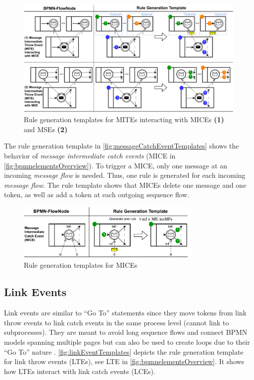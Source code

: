 \documentclass{lmcs} %
\begin{document}
\begin{figure}[ht]
    \centering
    \includegraphics[width=1\textwidth]{images/mite_template.pdf}
    \caption{Rule generation templates for MITEs interacting with MICEs \textbf{(1)} and MSEs \textbf{(2)}}
    \label{fig:messageThrowEventTemplates}
\end{figure}

The rule generation template in \autoref{fig:messageCatchEventTemplates} shows the behavior of \textit{message intermediate catch events} (\textsf{MICE} in \autoref{fig:bpmnelementsOverview}).
To trigger a MICE, only one message at an incoming \textit{message flow} is needed.
Thus, one rule is generated for each incoming \textit{message flow}.
The rule template shows that MICEs delete one message and one token, as well as add a token at each outgoing sequence flow.

\begin{figure}[ht]
    \centering
    \includegraphics[width=0.8\textwidth]{images/mice_template.pdf}
    \caption{Rule generation templates for MICEs}
    \label{fig:messageCatchEventTemplates}
\end{figure}


\subsection{Link Events} \label{subsec:signalEvents}
Link events are similar to \enquote{Go To} statements since they move tokens from link throw events to link catch events in the same process level (cannot link to subprocesses).
They are meant to avoid long sequence flows and connect BPMN models spanning multiple pages but can also be used to create loops due to their \enquote{Go To} nature \cite{objectmanagementgroupBusinessProcessModel2013}.
\autoref{fig:linkEventTemplates} depicts the rule generation template for link throw events (LTEs), see \textsf{LTE} in \autoref{fig:bpmnelementsOverview}.
It shows how LTEs interact with link catch events (LCEs).
\end{document}

